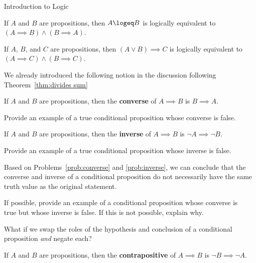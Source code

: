 \begin{section}{Introduction to Logic}
\begin{theorem}\label{thm:logical form for iff}
If $A$ and $B$ are propositions, then $A\logeq B$ is logically equivalent to $(A\implies B)\wedge (B\implies A)$.
\end{theorem}

\begin{theorem}\label{thm:logical form for cases}
If $A$, $B$, and $C$ are propositions, then $(A\vee B)\implies C$ is logically equivalent to $(A\implies C)\wedge (B\implies C)$.
\end{theorem}

We already introduced the following notion in the discussion following Theorem~\ref{thm:divides sum}

\begin{definition}\label{def:converse}
If $A$ and $B$ are propositions, then the \textbf{converse} of $A \implies B$ is $B \implies A$.
\end{definition}

\begin{problem}\label{prob:converse}
Provide an example of a true conditional proposition whose converse is false.
\end{problem}

\begin{definition}\label{def:inverse}
If $A$ and $B$ are propositions, then the \textbf{inverse} of $A \implies B$ is $\neg A \implies \neg B$.
\end{definition}

\begin{problem}\label{prob:inverse}
Provide an example of a true conditional proposition whose inverse is false.
\end{problem}

Based on Problems~\ref{prob:converse} and \ref{prob:inverse}, we can conclude that the converse and inverse of a conditional proposition do not necessarily have the same truth value as the original statement.  

\begin{problem}\label{prob:converse and inverse}
If possible, provide an example of a conditional proposition whose converse is true but whose inverse is false. If this is not possible, explain why.
\end{problem}

What if we swap the roles of the hypothesis and conclusion of a conditional proposition \emph{and} negate each?

\begin{definition}
If $A$ and $B$ are propositions, then the \textbf{contrapositive} of $A \implies B$ is $\neg B \implies \neg A$.
\end{definition}


\end{section}
